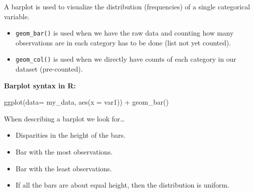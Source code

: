 \documentclass[
  letterpaper,
  DIV=11,
  numbers=noendperiod]{scrreprt}
\newenvironment{Shaded}{\begin{snugshade}}{\end{snugshade}}
\newcommand{\AttributeTok}[1]{\textcolor[rgb]{0.40,0.45,0.13}{#1}}
\newcommand{\FunctionTok}[1]{\textcolor[rgb]{0.28,0.35,0.67}{#1}}
\newcommand{\NormalTok}[1]{\textcolor[rgb]{0.00,0.23,0.31}{#1}}
\newcommand{\SpecialCharTok}[1]{\textcolor[rgb]{0.37,0.37,0.37}{#1}}
\providecommand{\tightlist}{%
  \setlength{\itemsep}{0pt}\setlength{\parskip}{0pt}}\usepackage{longtable,booktabs,array}
\begin{document}
\begin{tcolorbox}[enhanced jigsaw, colframe=quarto-callout-note-color-frame, breakable, colback=white, toprule=.15mm, leftrule=.75mm, left=2mm, opacityback=0, rightrule=.15mm, arc=.35mm, bottomrule=.15mm]

A barplot is used to visualize the distribution (frequencies) of a
single categorical variable.

\begin{itemize}
\item
  \texttt{geom\_bar()} is used when we have the raw data and counting
  how many observations are in each category has to be done (list not
  yet counted).
\item
  \texttt{geom\_col()} is used when we directly have counts of each
  category in our dataset (pre-counted).
\end{itemize}

\textbf{Barplot syntax in R:}

\begin{Shaded}
\begin{Highlighting}[]
\FunctionTok{ggplot}\NormalTok{(}\AttributeTok{data=}\NormalTok{ my\_data, }\FunctionTok{aes}\NormalTok{(}\AttributeTok{x =}\NormalTok{ var1)) }\SpecialCharTok{+}
  \FunctionTok{geom\_bar}\NormalTok{()}
\end{Highlighting}
\end{Shaded}

\end{tcolorbox}

\begin{tcolorbox}[enhanced jigsaw, colframe=quarto-callout-note-color-frame, breakable, colback=white, toprule=.15mm, leftrule=.75mm, left=2mm, opacityback=0, rightrule=.15mm, arc=.35mm, bottomrule=.15mm]

When describing a barplot we look for\ldots{}

\begin{itemize}
\tightlist
\item
  Disparities in the height of the bars.
\item
  Bar with the most observations.
\item
  Bar with the least observations.
\item
  If all the bars are about equal height, then the distribution is
  uniform.
\end{itemize}

\end{tcolorbox}
\end{document}
